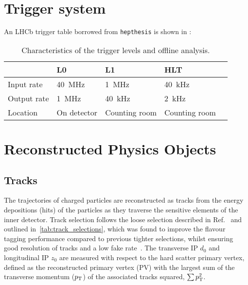 \section{Trigger system}
\label{sec:bg-theory:triggers}
An LHCb trigger table borrowed from \texttt{hepthesis} is shown in :

\begin{table}[bht]
  \footnotesize\centering
  \setlength{\tabcolsep}{0.5em} %
  \caption{Characteristics of the trigger levels and offline analysis.}
  \begin{tabular}{lllll}
                & L0              & L1              & HLT             \\
    \midrule
    Input rate  & \SI{40}{\MHz} & \SI{1}{\MHz}  & \SI{40}{\kHz} \\
    Output rate & \SI{1}{\MHz}  & \SI{40}{\kHz} & \SI{2}{\kHz}  \\
    Location    & On detector     & Counting room   & Counting room   \\
  \end{tabular}
  \label{tab:bg-theory:trigger_details}
\end{table}

\section{Reconstructed Physics Objects}\label{sec:physics-objects}

\subsection{Tracks}\label{sec:tracks}

The trajectories of charged particles are reconstructed as tracks from the energy depositions (hits) of the particles as they traverse the sensitive elements of the inner detector.
Track selection follows the loose selection described in Ref.~\cite{ATL-PHYS-PUB-2020-014} and outlined in~\cref{tab:track_selections}, which was found to improve the flavour tagging performance compared to previous tighter selections, whilst ensuring good resolution of tracks and a low fake rate~\cite{PERF-2015-08}.
The transverse IP $d_0$ and longitudinal IP $z_0$ are measured with respect to the hard scatter primary vertex, defined as the reconstructed primary vertex (PV) with the largest sum of the transverse momentum ($p_{\text{T}}$) of the associated tracks squared, $\sum p_{\text{T}}^2$.


